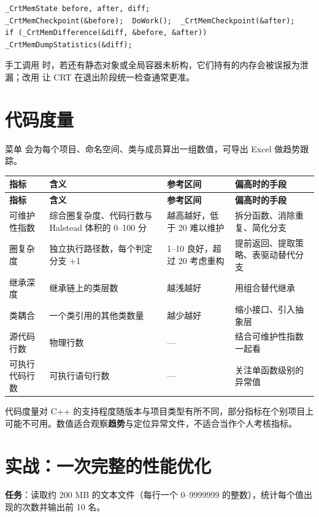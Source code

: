 \begin{lstlisting}[style=cppstyle]
_CrtMemState before, after, diff;
_CrtMemCheckpoint(&before);  DoWork();  _CrtMemCheckpoint(&after);
if (_CrtMemDifference(&diff, &before, &after)) _CrtMemDumpStatistics(&diff);
\end{lstlisting}

\begin{warnbox}[注意]
手工调用  时，若还有静态对象或全局容器未析构，它们持有的内存会被误报为泄漏；改用  让 CRT 在退出阶段统一检查通常更准。
\end{warnbox}

\section{代码度量}
菜单  会为每个项目、命名空间、类与成员算出一组数值，可导出 Excel 做趋势跟踪。

\begin{longtable}{L{2.4cm}L{4.6cm}L{3.6cm}L{3.6cm}}
\toprule \textbf{指标} & \textbf{含义} & \textbf{参考区间} & \textbf{偏高时的手段} \\ \midrule
\endfirsthead
\toprule \textbf{指标} & \textbf{含义} & \textbf{参考区间} & \textbf{偏高时的手段} \\ \midrule
\endhead
\bottomrule \endlastfoot
可维护性指数 & 综合圈复杂度、代码行数与 Halstead 体积的 0--100 分 & 越高越好，低于 20 难以维护 & 拆分函数、消除重复、简化分支 \\
圈复杂度 & 独立执行路径数，每个判定分支 +1 & 1--10 良好，超过 20 考虑重构 & 提前返回、提取策略、表驱动替代分支 \\
继承深度 & 继承链上的类层数 & 越浅越好 & 用组合替代继承 \\
类耦合 & 一个类引用的其他类数量 & 越少越好 & 缩小接口、引入抽象层 \\
源代码行数 & 物理行数 & --- & 结合可维护性指数一起看 \\
可执行代码行数 & 可执行语句行数 & --- & 关注单函数级别的异常值 \\
\end{longtable}

\begin{tipbox}[提示]
代码度量对 C++ 的支持程度随版本与项目类型有所不同，部分指标在个别项目上可能不可用。数值适合观察\textbf{趋势}与定位异常文件，不适合当作个人考核指标。
\end{tipbox}

\section{实战：一次完整的性能优化}
\textbf{任务}：读取约 200 MB 的文本文件（每行一个 0--9999999 的整数），统计每个值出现的次数并输出前 10 名。

